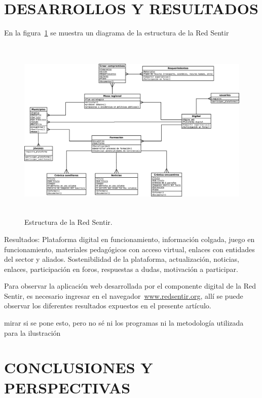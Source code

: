 \documentclass[a4paper]{article}
\begin{document}
\section{DESARROLLOS Y RESULTADOS}\label{sec:resultados}

En la figura~\ref{fig:red} se muestra un diagrama de la estructura de la Red Sentir

\begin{figure}[t]
\centering
\includegraphics[width=6in,height=3.5in]{red.eps}
\caption{Estructura de la Red Sentir.}
\label{fig:red}
\end{figure}


Resultados: Plataforma digital en funcionamiento, información colgada, juego en funcionamiento, materiales pedagógicos con acceso virtual, enlaces con entidades del sector y aliados.  Sostenibilidad de la plataforma, actualización, noticias, enlaces, participación en foros, respuestas a dudas, motivación a participar.

Para observar la aplicación web desarrollada por el componente digital de la Red Sentir, es necesario ingresar en el navegador~\url{www.redsentir.org}, allí se puede observar los diferentes resultados expuestos en el presente artículo.



mirar si se pone esto, pero no sé ni los programas ni la metodología utilizada para la ilustración 

\section{CONCLUSIONES Y PERSPECTIVAS}\label{sec:conclusiones}


\clearpage


\end{document}
